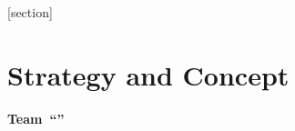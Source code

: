 \documentclass[a4paper,10pt]{article}
\title{\thestrategy}
\begin{document}
\thispagestyle{empty}
\renewcommand*{\thesubsection}{\arabic{subsection}}
[section]
\setcounter{questioncounter}{1}
\setcounter{page}{1}
\setcounter{section}{1}

\section*{Strategy and Concept} \label{sec:businessdataunderstanding}
\textbf{\large Team~``\@author''}



\nocite{ProvostFawcett2015} %


\end{document}
